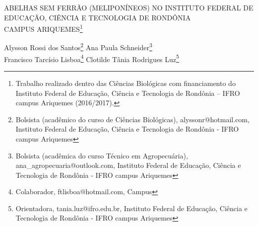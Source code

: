 \documentclass[article,12pt,onesidea,4paper,english,brazil]{abntex2}
\begin{document}
	
	
	\frenchspacing 
	
	\begin{center}
		\LARGE \MakeUppercase{Abelhas sem ferrão (Meliponíneos) no Instituto Federal de Educação, Ciência e Tecnologia de Rondônia}\\\MakeUppercase{campus Ariquemes}\footnote{Trabalho realizado dentro das Ciências Biológicas com financiamento do Instituto Federal de Educação, Ciência e Tecnologia de Rondônia – IFRO campus Ariquemes (2016/2017).}
		
		\normalsize
	Alysson Rossi dos Santos\footnote{Bolsista (acadêmico do curso de Ciências Biológicas), alyssonr@hotmail.com, Instituto Federal de Educação, Ciência e Tecnologia de Rondônia - IFRO campus Ariquemes} 
		Ana Paula Schneider\footnote{Bolsista (acadêmica do curso Técnico em Agropecuária), ana\_agropecuaria@outlook.com, Instituto Federal de Educação, Ciência e Tecnologia de Rondônia - IFRO campus Ariquemes} \\
	Francisco Tarcísio Lisboa\footnote{Colaborador, ftlisboa@hotmail.com, Campus} 
		Clotilde Tânia Rodrigues Luz\footnote{Orientadora, tania.luz@ifro.edu.br, Instituto Federal de Educação, Ciência e Tecnologia de Rondônia - IFRO campus Ariquemes} 
	\end{center}
	
\end{document}
